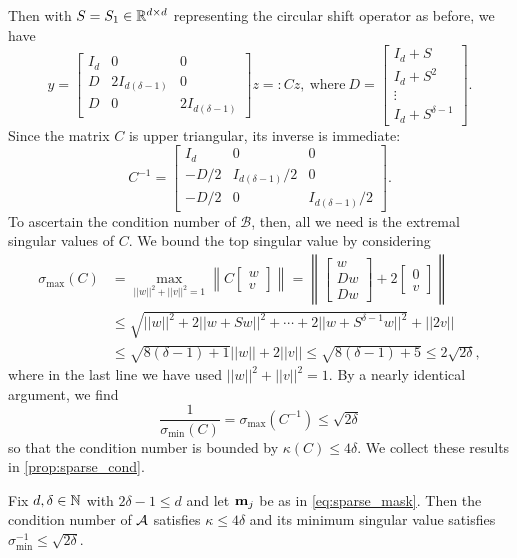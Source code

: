 Then with $S = S_1 \in \mathbb{R}^{d \times d}$ representing the circular shift operator as before, we have  %
%
\[y = \begin{bmatrix} I_d & 0 & 0 \\ D & 2 I_{d(\delta - 1)} & 0 \\ D & 0 & 2 I_{d(\delta - 1)} \end{bmatrix}z =: Cz, \ \text{where} \ D = \begin{bmatrix} I_d + S \\ I_d + S^2 \\ \vdots \\ I_d + S^{\delta - 1} \end{bmatrix}.\]  Since the matrix $C$ is upper triangular, its inverse is immediate: \[C^{-1} = \begin{bmatrix} I_d & 0 & 0 \\ -D / 2 & I_{d(\delta-1)} / 2 & 0 \\ -D / 2 & 0 & I_{d(\delta-1)} / 2 \end{bmatrix}.\]  To ascertain the condition number of $\mathcal{B}$, then, all we need is the extremal singular values of $C$.  We bound the top singular value by considering
\begin{align*}
\sigma_{\max}(C) &= \max_{||w||^2 + ||v||^2 = 1} \left\lVert C\begin{bmatrix} w \\ v \end{bmatrix} \right\rVert = \left\lVert \begin{bmatrix} w \\ D w \\ D w \end{bmatrix} + 2\begin{bmatrix} 0 \\ v \end{bmatrix} \right\rVert \\
&\le \sqrt{||w||^2 + 2 ||w + Sw||^2 + \cdots + 2 ||w + S^{\delta - 1} w||^2} + ||2 v|| \\
&\le \sqrt{8 (\delta - 1) + 1}||w|| + 2 ||v|| \le \sqrt{8(\delta - 1) + 5} \le 2\sqrt{2 \delta},
\end{align*}
where in the last line we have used $||w||^2 + ||v||^2 = 1$.  By a nearly identical argument, we find \[\dfrac{1}{\sigma_{\min}(C)} = \sigma_{\max}(C^{-1}) \le \sqrt{2 \delta}\] so that the condition number is bounded by $\kappa(C) \le 4\delta$.  We collect these results in \cref{prop:sparse_cond}.
\begin{proposition}
  Fix $d, \delta \in \mathbb{N}$ with $2 \delta - 1 \le d$ and let $\mathbf m_j$ be as in \eqref{eq:sparse_mask}.  Then the condition number of $\mathcal{A}$ satisfies $\kappa \le 4 \delta$ and its minimum singular value satisfies $\sigma_{\min}^{-1} \le \sqrt{2\delta}$.
  \label{prop:sparse_cond}
\end{proposition}
